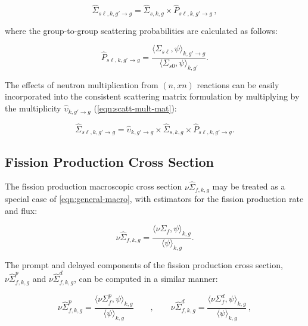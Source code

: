 \begin{equation}
\label{eqn:scatt-mat-consistent}
\hat{\Sigma}_{s\ell,k,g'\rightarrow g} = \hat{\Sigma}_{s,k,g} \times \hat{P}_{s\ell,k,g'\rightarrow g}\,,
\end{equation}

\noindent where the group-to-group scattering probabilities are calculated as follows:

\begin{equation}
\label{eqn:scatt-prob-mat}
\hat{P}_{s\ell,k,g'\rightarrow g} = \frac{{\langle \Sigma_{s\ell}, \psi \rangle}_{k,g'\rightarrow g}}{{\langle \Sigma_{s0}, \psi \rangle}_{k,g'}}.
\end{equation}

The effects of neutron multiplication from $(n,xn)$ reactions can be easily incorporated into the consistent scattering matrix formulation by multiplying by the multiplicity $\hat{\upsilon}_{k,g'\rightarrow g}$ (\cref{eqn:scatt-mult-mat}):

\begin{equation}
\label{eqn:nuscatt-mat-consistent}
\hat{\Sigma}_{s\ell,k,g'\rightarrow g} = \hat{\upsilon}_{k,g'\rightarrow g} \times \hat{\Sigma}_{s,k,g} \times \hat{P}_{s\ell,k,g'\rightarrow g}.
\end{equation}

\subsection{Fission Production Cross Section}
\label{subsubsec:tally-types-fiss-prod}

The fission production macroscopic cross section $\nu\hat{\Sigma}_{f,k,g}$ may be treated as a special case of \cref{eqn:general-macro}, with estimators for the fission production rate and flux:

\begin{equation}
\label{eqn:nu-fiss-macro}
\nu\hat{\Sigma}_{f,k,g} = \frac{\langle \nu\Sigma_{f}, \psi \rangle_{k,g}}{\langle \psi \rangle_{k,g}}.
\end{equation}

\noindent The prompt and delayed components of the fission production cross section, $\nu\hat{\Sigma}_{f,k,g}^{p}$ and $\nu\hat{\Sigma}_{f,k,g}^{d}$, can be computed in a similar manner:

\begin{equation}
\label{eqn:nu-fiss-macro-specific}
\nu\hat{\Sigma}_{f,k,g}^{p} = \frac{\langle \nu\Sigma_{f}^{p}, \psi \rangle_{k,g}}{\langle \psi \rangle_{k,g}} \qquad , \qquad \nu\hat{\Sigma}_{f,k,g}^{d} = \frac{\langle \nu\Sigma_{f}^{d}, \psi \rangle_{k,g}}{\langle \psi \rangle_{k,g}}\,,
\end{equation}

